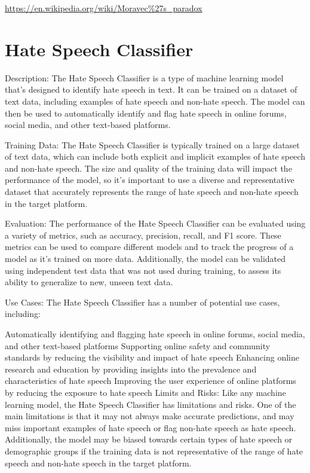 \url{https://en.wikipedia.org/wiki/Moravec\%27s_paradox}

\section{Hate Speech Classifier}

Description:
The Hate Speech Classifier is a type of machine learning model that's designed to identify hate speech in text. It can be trained on a dataset of text data, including examples of hate speech and non-hate speech. The model can then be used to automatically identify and flag hate speech in online forums, social media, and other text-based platforms.

Training Data:
The Hate Speech Classifier is typically trained on a large dataset of text data, which can include both explicit and implicit examples of hate speech and non-hate speech. The size and quality of the training data will impact the performance of the model, so it's important to use a diverse and representative dataset that accurately represents the range of hate speech and non-hate speech in the target platform.

Evaluation:
The performance of the Hate Speech Classifier can be evaluated using a variety of metrics, such as accuracy, precision, recall, and F1 score. These metrics can be used to compare different models and to track the progress of a model as it's trained on more data. Additionally, the model can be validated using independent test data that was not used during training, to assess its ability to generalize to new, unseen text data.

Use Cases:
The Hate Speech Classifier has a number of potential use cases, including:

Automatically identifying and flagging hate speech in online forums, social media, and other text-based platforms
Supporting online safety and community standards by reducing the visibility and impact of hate speech
Enhancing online research and education by providing insights into the prevalence and characteristics of hate speech
Improving the user experience of online platforms by reducing the exposure to hate speech
Limits and Risks:
Like any machine learning model, the Hate Speech Classifier has limitations and risks. One of the main limitations is that it may not always make accurate predictions, and may miss important examples of hate speech or flag non-hate speech as hate speech. Additionally, the model may be biased towards certain types of hate speech or demographic groups if the training data is not representative of the range of hate speech and non-hate speech in the target platform.

